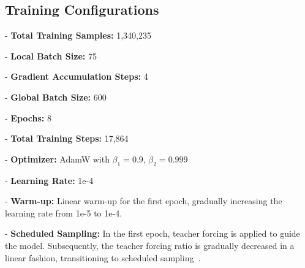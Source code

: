 \subsection*{Training Configurations}
\phantom{.}\vspace{-14pt}

- \textbf{Total Training Samples:} 1,340,235

- \textbf{Local Batch Size:} 75

- \textbf{Gradient Accumulation Steps:} 4

- \textbf{Global Batch Size:} 600

- \textbf{Epochs:} 8

- \textbf{Total Training Steps:} 17,864

- \textbf{Optimizer:} AdamW with $\beta_1 = 0.9$, $\beta_2 = 0.999$

- \textbf{Learning Rate:} 1e-4

- \textbf{Warm-up:} Linear warm-up for the first  epoch, gradually increasing the learning rate from 1e-5 to 1e-4.

- \textbf{Scheduled Sampling:} In the first epoch, teacher forcing is applied to guide the model. Subsequently, the teacher forcing ratio is gradually decreased in a linear fashion, transitioning to scheduled sampling~\citep{2015scheduled-sampling}.


